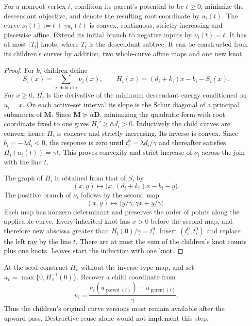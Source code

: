 \begin{lemma}
\label{lem:op3-tree-embedding}
For a nonroot vertex $i$, condition its parent's potential to be $t\geq0$,
minimize the descendant objective, and denote the resulting root coordinate
by $u_i(t)$. The curve $\nu_i(t):=t+\gamma u_i(t)$ is convex, continuous,
strictly increasing and piecewise affine. Extend its initial branch to
negative inputs by $\nu_i(t)=t$. It has at most $|T_i|$ knots, where $T_i$
is the descendant subtree. It can be constructed from its children's
curves by addition, two whole-curve affine maps and one new knot.
\end{lemma}
\begin{proof}
For $k_i$ children define
\[
 S_i(x)=\sum_{j\text{ child of }i}\nu_j(x),\qquad
 H_i(x)=(d_i+k_i)x-b_i-S_i(x).
\]
For $x\geq0$, $H_i$ is the derivative of the minimum descendant energy
conditioned on $u_i=x$. On each active-set interval its slope is the Schur
diagonal of a principal submatrix of $\bm M$. Since
$\bm M\succeq\bar\alpha\bm D$, minimizing the quadratic form with root
coordinate fixed to one gives $H_i'\geq\bar\alpha d_i>0$.
Inductively the child curves are convex; hence $H_i$ is concave and strictly
increasing. Its inverse is convex. Since $b_i=-\lambda d_i<0$, the response
is zero until $t_i^0=\lambda d_i/\gamma$ and thereafter satisfies
$H_i(u_i(t))=\gamma t$. This proves convexity and strict increase of
$\nu_i$ across the join with the line $t$.

The graph of $H_i$ is obtained from that of $S_i$ by
\[
 (x,y)\longmapsto\bigl(x,(d_i+k_i)x-b_i-y\bigr).
\]
The positive branch of $\nu_i$ follows by the second map
\[
 (x,y)\longmapsto\bigl(y/\gamma,\gamma x+y/\gamma\bigr).
\]
Each map has nonzero determinant and preserves the order of points along
the applicable curve. Every inherited knot has $x>0$ before the second
map, and therefore new abscissa greater than $H_i(0)/\gamma=t_i^0$.
Insert $(t_i^0,t_i^0)$ and replace the left ray by the line $t$. There are
at most the sum of the children's knot counts plus one knots. Leaves
start the induction with one knot.
\end{proof}

At the seed construct $H_v$ without the inverse-type map, and set
$u_v=\max\{0,H_v^{-1}(0)\}$. Recover a child coordinate from
\begin{equation}
 u_i=\frac{\nu_i(u_{\operatorname{parent}(i)})
                 -u_{\operatorname{parent}(i)}}{\gamma}.
 \label{eq:op3-tree-reconstruct}
\end{equation}
Thus the children's original curve versions must remain available after
the upward pass. Destructive reuse alone would not implement this step.

